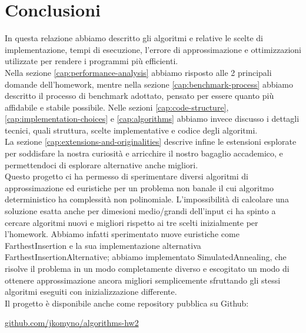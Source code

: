 \section{Conclusioni}
\label{cap:conclusions}

In questa relazione abbiamo descritto gli algoritmi e relative le
scelte di implementazione, tempi di esecuzione, l'errore di
approssimazione e ottimizzazioni utilizzate per rendere i programmi
più efficienti. \\

\noindent Nella sezione \ref{cap:performance-analysis} abbiamo
risposto alle 2 principali domande dell'homework, mentre nella sezione
\ref{cap:benchmark-process} abbiamo descritto il processo di benchmark
adottato, pensato per essere quanto più affidabile e stabile
possibile.  Nelle sezioni \ref{cap:code-structure},
\ref{cap:implementation-choices} e \ref{cap:algorithms} abbiamo invece
discusso i dettagli tecnici, quali struttura, scelte implementative e
codice degli algoritmi. \\

\noindent La sezione \ref{cap:extensions-and-originalities} descrive
infine le estensioni esplorate per soddisfare la nostra curiosità e
arricchire il nostro bagaglio accademico, e permettendoci di esplorare
alternative anche migliori. \\

\noindent Questo progetto ci ha permesso di sperimentare diversi
algoritmi di approssimazione ed euristiche per un problema non banale
il cui algoritmo deterministico ha complessità non
polinomiale. L'impossibilità di calcolare una soluzione esatta anche
per dimesioni medio/grandi dell'input ci ha spinto a cercare algoritmi
nuovi e migliori rispetto ai tre scelti inizialmente per
l'homework. Abbiamo infatti sperimentato nuove euristiche come
FarthestInsertion e la sua implementazione alternativa
FarthestInsertionAlternative; abbiamo implementato SimulatedAnnealing,
che risolve il problema in un modo completamente diverso e escogitato
un modo di ottenere approssimazione ancora migliori semplicemente
sfruttando gli stessi algoritmi eseguiti con inizializzazione
differente.\\

\noindent Il progetto è disponibile anche come repository pubblica su Github:

\begin{center}
\href{https://github.com/jkomyno/algorithms-hw2}{github.com/jkomyno/algorithms-hw2}
\end{center}
